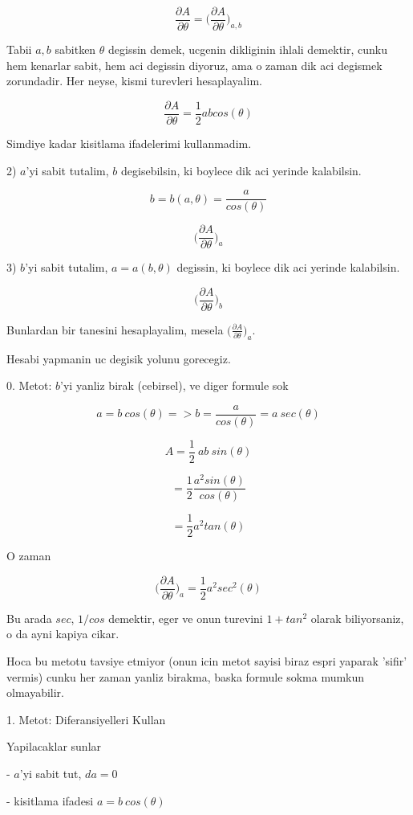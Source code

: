 \documentclass[12pt,fleqn]{article}
\begin{document}
\[ \frac{\partial A}{\partial \theta} = 
\bigg( \frac{\partial A}{\partial \theta} \bigg)_{a,b}  \]

Tabii $a,b$ sabitken $\theta$ degissin demek, ucgenin dikliginin ihlali
demektir, cunku hem kenarlar sabit, hem aci degissin diyoruz, ama o zaman
dik aci degismek zorundadir. Her neyse, kismi turevleri hesaplayalim. 

\[ \frac{\partial A}{\partial \theta} = \frac{1}{2}ab cos(\theta) \]

Simdiye kadar kisitlama ifadelerimi kullanmadim. 

2) $a$'yi sabit tutalim, $b$ degisebilsin, ki boylece dik aci yerinde
kalabilsin. 

\[ b = b(a,\theta) = \frac{a}{cos(\theta)} \]

\[ \bigg( \frac{\partial A}{\partial \theta} \bigg)_{a}  \]

3) $b$'yi sabit tutalim, $a = a(b,\theta)$ degissin, ki boylece dik aci yerinde
kalabilsin. 

\[ \bigg( \frac{\partial A}{\partial \theta} \bigg)_{b}  \]

Bunlardan bir tanesini hesaplayalim, mesela $\bigg( \frac{\partial A}{\partial \theta} \bigg)_{a} $.

Hesabi yapmanin uc degisik yolunu gorecegiz. 

0. Metot: $b$'yi yanliz birak (cebirsel), ve diger formule sok

\[ a = b \ cos (\theta) => b = \frac{a}{cos(\theta)} = a \ sec (\theta)\]

\[ A = \frac{1}{2} \ ab \ sin(\theta) \]

\[ = \frac{1}{2} \frac{a^2 sin(\theta)}{cos(\theta)} \]

\[ = \frac{1}{2} a^2 tan(\theta) \]

O zaman 

\[ \bigg( \frac{\partial A}{\partial \theta} \bigg)_{a} = 
\frac{1}{2}a^2sec^2(\theta)
 \]

Bu arada $sec$, $1/cos$ demektir, eger ve onun turevini $1+tan^2$ olarak
biliyorsaniz, o da ayni kapiya cikar. 

Hoca bu metotu tavsiye etmiyor (onun icin metot sayisi biraz espri yaparak
'sifir' vermis) cunku her zaman yanliz birakma, baska formule sokma mumkun
olmayabilir.

1. Metot: Diferansiyelleri Kullan

Yapilacaklar sunlar

- $a$'yi sabit tut, $da = 0$

- kisitlama ifadesi $a = b \ cos(\theta)$
\end{document}
